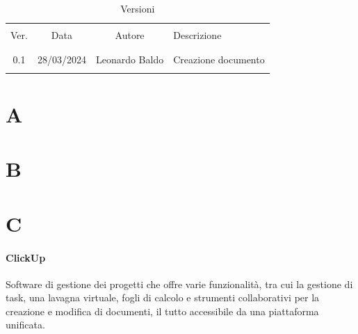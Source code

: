 \documentclass[italian,12pt]{article} %
\begin{document}


\newpage



\begin{table}[!h]
	\caption{Versioni}
	\begin{center}
		\begin{tabular}{ c c c p{9cm} }
			\hline \\[-2ex]
			Ver. & Data       & Autore         & Descrizione \\
			\\[-2ex] \hline \\[-1.5ex]
			0.1  & 28/03/2024 & Leonardo Baldo & Creazione documento \\
			\\[-1.5ex] \hline
		\end{tabular}
	\end{center}
\end{table}

\newpage

\tableofcontents


\newpage

\section{A}



\newpage

\section{B}



\newpage

\section{C}
\paragraph{ClickUp} Software di gestione dei progetti che offre varie funzionalità, tra cui la gestione di task, una lavagna virtuale, fogli di calcolo e strumenti collaborativi per la creazione e modifica di documenti, il tutto accessibile da una piattaforma unificata.
\end{document}
